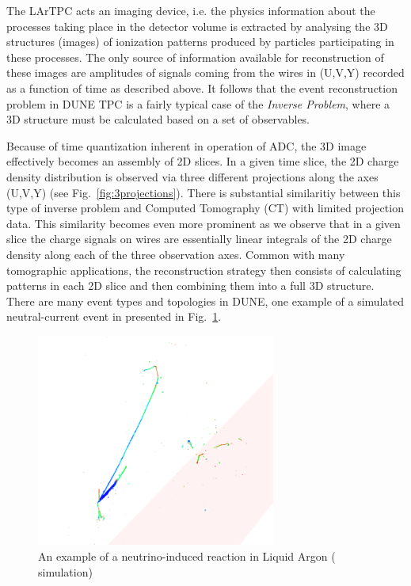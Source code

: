 The LArTPC acts an imaging device, i.e. the physics information about the processes taking place in the detector volume is extracted by
analysing the 3D structures (images) of ionization patterns produced by particles participating in these processes. The only source of information
available for reconstruction of these images are amplitudes of signals coming from the wires in (U,V,Y) recorded as a function of time
as described above. It follows that the event reconstruction problem in DUNE TPC is a fairly typical case of the \textit{Inverse Problem},
where a 3D structure must be calculated based on a set of observables.

Because of time quantization inherent in operation of ADC, the 3D image effectively becomes an assembly of 2D slices.
In a given time slice, the 2D charge density distribution is observed via three different projections along the axes (U,V,Y) (see Fig.~\ref{fig:3projections}).
There is substantial similaritiy between this type of inverse problem and Computed Tomography (CT) with limited projection data. This similarity becomes even more prominent as we observe that in a
given slice the charge signals on wires are essentially linear integrals of the 2D charge density along each of the three observation axes. Common with many tomographic applications, the reconstruction strategy
then consists of calculating patterns in each 2D slice and then combining them into a full 3D structure. There are many event types and topologies
in DUNE, one example of a simulated neutral-current event in presented in Fig.~\ref{fig:ncc-example-1}.

\begin{figure}[h!]
	\centering
	\includegraphics[width=0.7\textwidth]{ncc-example-1.png}
	\caption{An example of a neutrino-induced reaction in Liquid Argon ( simulation)}
	\label{fig:ncc-example-1}
\end{figure}

